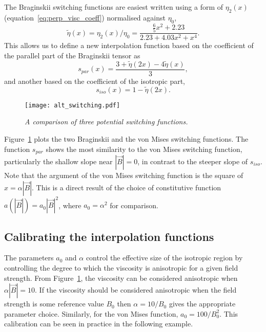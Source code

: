 The Braginskii switching functions are easiest written using a form of $\eta_2(x)$ (equation~\eqref{eq:perp_visc_coeff}) normalised against $\eta_0$,
\begin{equation}
  \label{eq:eta_function}
  \tilde{\eta}(x) = \eta_2(x)/\eta_0 = \frac{\tfrac{6}{5}x^2 + 2.23}{2.23 + 4.03 x^2 + x^4}.
\end{equation}
This allows us to define a new interpolation function based on the coefficient of the parallel part of the Braginskii tensor as
\begin{equation}
  \label{eq:alt_switching1}
s_{par}(x) = \frac{3+\tilde{\eta}(2x)-4\tilde{\eta}(x)}{3},
\end{equation}
and another based on the coefficient of the isotropic part,
\begin{equation}
  \label{eq:alt_switching2}
s_{iso}(x) = 1 - \tilde{\eta}(2x).
\end{equation}

\begin{figure}[t]
  \centering
  \texttt{[image: alt\_switching.pdf]}
  \caption{\emph{A comparison of three potential switching functions.}}%
  \label{fig:alt_switching}
\end{figure}

Figure~\ref{fig:alt_switching} plots the two Braginskii and the von Mises switching functions. The function $s_{par}$ shows the most similarity to the von Mises switching function, particularly the shallow slope near $|\vec{B}| = 0$, in contrast to the steeper slope of $s_{iso}$. Note that the argument of the von Mises switching function is the square of $x = \alpha |\vec{B}|$. This is a direct result of the choice of constitutive function $a(|\vec{B}|) = a_0 |\vec{B}|^2$, where $a_0 = \alpha^2$ for comparison.

\subsection{Calibrating the interpolation functions}

The parameters $a_0$ and $\alpha$ control the effective size of the isotropic region by controlling the degree to which the viscosity is anisotropic for a given field strength. From Figure~\ref{fig:alt_switching}, the viscosity can be considered anisotropic when $\alpha |\vec{B}| = 10$. If the viscosity should be considered anisotropic when the field strength is some reference value $B_0$ then $\alpha = 10/B_0$ gives the appropriate parameter choice. Similarly, for the von Mises function, $a_0 = 100/B_0^2$. This calibration  can be seen in practice in the following example.

